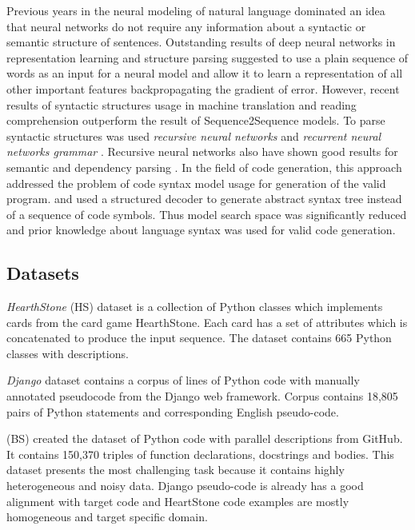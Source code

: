 Previous years in the neural modeling of natural language dominated an idea that neural networks do not require any information about a syntactic or semantic structure of sentences. Outstanding results of deep neural networks in representation learning and structure parsing suggested to use a plain sequence of words as an input for a neural model and allow it to learn a representation of all other important features backpropagating the gradient of error. However, recent results of syntactic structures usage in machine translation \parencite{Chen2017} and reading comprehension \parencite{xie2017constituent} outperform the result of Sequence2Sequence models. To parse syntactic structures was used \emph{recursive neural networks} \parencite{Gollera, socher2011parsing} and \emph{recurrent neural networks grammar} \parencite{Dyer2016}. Recursive neural networks also have shown good results for semantic \parencite{Tai2015} and dependency parsing \parencite{Zhu2015}. In the field of code generation, this approach addressed the problem of code syntax model usage for generation of the valid program. \cite{Yin2017} and \cite{Rabinovich2017} used a structured decoder to generate abstract syntax tree instead of a sequence of code symbols. Thus model search space was significantly reduced and prior knowledge about language syntax was used for valid code generation.

\subsection{Datasets}
\emph{HearthStone} (HS) dataset \parencite{Ling2016} is a collection of Python classes which implements cards from the card game HearthStone. Each card has a set of attributes which is concatenated to produce the input sequence. The dataset contains 665 Python classes with descriptions.

\emph{Django} dataset \parencite{Oda2015} contains a corpus of lines of Python code with manually annotated pseudocode from the Django web framework. Corpus contains 18,805 pairs of Python statements and corresponding English pseudo-code. 

\cite{Barone2017} (BS) created the dataset of Python code with parallel descriptions from GitHub. It contains 150,370 triples of function declarations, docstrings and bodies. This dataset presents the most challenging task because it contains highly heterogeneous and noisy data. Django pseudo-code is already has a good alignment with target code and HeartStone code examples are mostly homogeneous and target specific domain.

